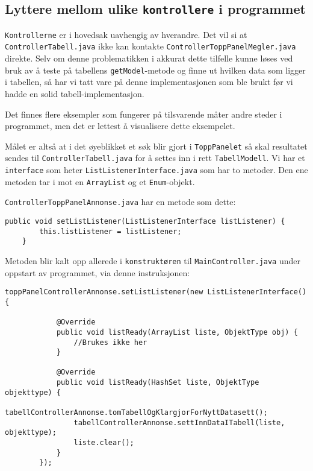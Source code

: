 \subsection{Lyttere mellom ulike \texttt{kontrollere} i programmet} \label{sec:kontrollerlyttere}

\texttt{Kontrollerne} er i hovedsak uavhengig av hverandre. Det vil si at \texttt{ControllerTabell.java} ikke kan kontakte \texttt{ControllerToppPanelMegler.java} direkte. Selv om denne problematikken i akkurat dette tilfelle kunne løses ved bruk av å teste på tabellens \texttt{getModel}-metode og finne ut hvilken data som ligger i tabellen, så har vi tatt vare på denne implementasjonen som ble brukt før vi hadde en solid tabell-implementasjon.

Det finnes flere eksempler som fungerer på tilsvarende måter andre steder i programmet, men det er lettest å visualisere dette eksempelet.

Målet er altså at i det øyeblikket et søk blir gjort i \texttt{ToppPanelet} så skal resultatet sendes til \texttt{ControllerTabell.java} for å settes inn i rett \texttt{TabellModell}.
Vi har et \texttt{interface} som heter \texttt{ListListenerInterface.java} som har to metoder. Den ene metoden tar i mot en \texttt{ArrayList} og et \texttt{Enum}-objekt.

\texttt{ControllerToppPanelAnnonse.java} har en metode som dette:

\begin{lstlisting}[caption=\texttt{setListListener}-metoden fra \texttt{ControllerToppPanelAnnonse.java},label=kode:snutt1]
    public void setListListener(ListListenerInterface listListener) {
        this.listListener = listListener;
    }
\end{lstlisting}

Metoden blir kalt opp allerede i \texttt{konstruktøren} til \texttt{MainController.java} under oppstart av programmet, via denne instruksjonen:

\begin{lstlisting}[caption=Setter lytter fra \texttt{MainController.java},label=kode:snutt2]
        toppPanelControllerAnnonse.setListListener(new ListListenerInterface() {

            @Override
            public void listReady(ArrayList liste, ObjektType obj) {
                //Brukes ikke her
            }

            @Override
            public void listReady(HashSet liste, ObjektType objekttype) {
                tabellControllerAnnonse.tomTabellOgKlargjorForNyttDatasett();
                tabellControllerAnnonse.settInnDataITabell(liste, objekttype);
                liste.clear();
            }
        });
\end{lstlisting}

